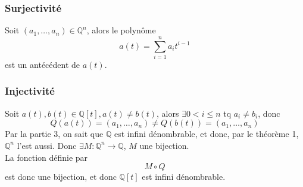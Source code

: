 \documentclass[11pt, a4paper, twoside]{article}
\begin{document}
\subsubsection*{Surjectivité}
Soit $(a_1,\ldots, a_n) \in \mathbb{Q}^{n}$, alors le polynôme
\[ 
	a(t) = \sum_{i=1}^{n} a_i t^{i-1}
\]
est un antécédent de $a(t)$.
\subsubsection*{Injectivité}
Soit $a(t), b(t) \in \mathbb{Q}[t], a(t) \neq b(t)$, alors $\exists 0<i \leq n$ tq $a_i \neq b_i$, donc
\[ 
	Q(a(t)) = ( a_1, \ldots, a_n) \neq Q(b(t)) = ( a_1, \ldots, a_n)
\]
Par la partie 3, on sait que $\mathbb{Q}$ est infini dénombrable, et donc, par le théorème 1, $\mathbb{Q}^{n}$ l'est aussi. Donc $\exists M: \mathbb{Q}^{n} \to \mathbb{Q}$, $M$ une bijection.\\
La fonction définie par
\[ 
M \circ Q
\]
est donc une bijection, et donc $\mathbb{Q}[t]$ est infini dénombrable.
\end{document}
